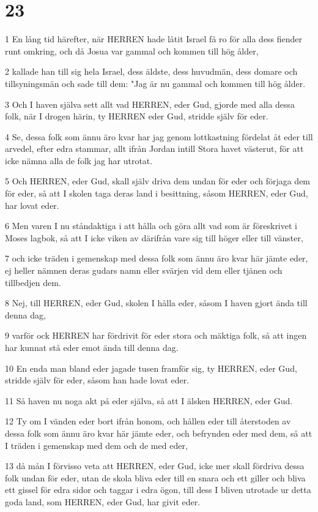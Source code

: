 \chapter{23}

\par 1 En lång tid härefter, när HERREN hade låtit Israel få ro för alla dess fiender runt omkring, och då Josua var gammal och kommen till hög ålder,
\par 2 kallade han till sig hela Israel, dess äldste, dess huvudmän, dess domare och tillsyningsmän och sade till dem: "Jag är nu gammal och kommen till hög ålder.
\par 3 Och I haven själva sett allt vad HERREN, eder Gud, gjorde med alla dessa folk, när I drogen härin, ty HERREN eder Gud, stridde själv för eder.
\par 4 Se, dessa folk som ännu äro kvar har jag genom lottkastning fördelat åt eder till arvedel, efter edra stammar, allt ifrån Jordan intill Stora havet västerut, för att icke nämna alla de folk jag har utrotat.
\par 5 Och HERREN, eder Gud, skall själv driva dem undan för eder och förjaga dem för eder, så att I skolen taga deras land i besittning, såsom HERREN, eder Gud, har lovat eder.
\par 6 Men varen I nu ståndaktiga i att hålla och göra allt vad som är föreskrivet i Moses lagbok, så att I icke viken av därifrån vare sig till höger eller till vänster,
\par 7 och icke träden i gemenskap med dessa folk som ännu äro kvar här jämte eder, ej heller nämnen deras gudars namn eller svärjen vid dem eller tjänen och tillbedjen dem.
\par 8 Nej, till HERREN, eder Gud, skolen I hålla eder, såsom I haven gjort ända till denna dag,
\par 9 varför ock HERREN har fördrivit för eder stora och mäktiga folk, så att ingen har kunnat stå eder emot ända till denna dag.
\par 10 En enda man bland eder jagade tusen framför sig, ty HERREN, eder Gud, stridde själv för eder, såsom han hade lovat eder.
\par 11 Så haven nu noga akt på eder själva, så att I älsken HERREN, eder Gud.
\par 12 Ty om I vänden eder bort ifrån honom, och hållen eder till återstoden av dessa folk som ännu äro kvar här jämte eder, och befrynden eder med dem, så att I träden i gemenskap med dem och de med eder,
\par 13 då mån I förvisso veta att HERREN, eder Gud, icke mer skall fördriva dessa folk undan för eder, utan de skola bliva eder till en snara och ett giller och bliva ett gissel för edra sidor och taggar i edra ögon, till dess I bliven utrotade ur detta goda land, som HERREN, eder Gud, har givit eder.
